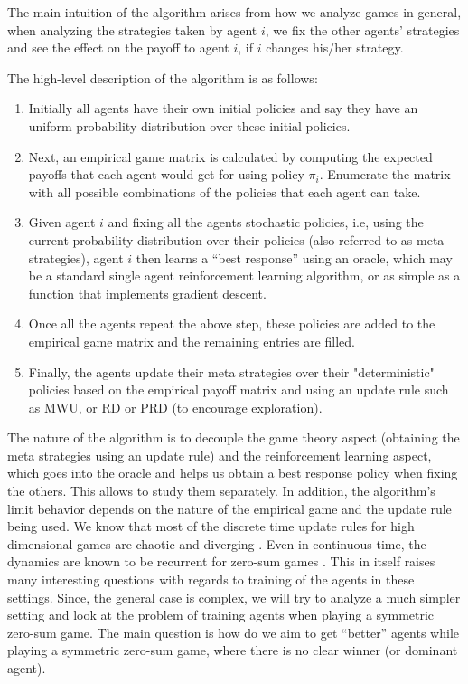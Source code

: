 \documentclass{article}
\begin{document}
The main intuition of the algorithm arises from how we analyze games in general, when analyzing the strategies taken by agent $i$, we fix the other agents' strategies and see the effect on the payoff to agent $i$, if $i$ changes his/her strategy. 

The high-level description of the algorithm is as follows:
\begin{enumerate}
	\item Initially all agents have their own initial policies and say they have an uniform probability distribution over these initial policies.
	\item Next, an empirical game matrix is calculated by computing the expected payoffs that each agent would get for using policy $\pi_i$. Enumerate the matrix with all possible combinations of the policies that each agent can take.
	\item Given agent $i$ and fixing all the agents stochastic policies, i.e, using the current probability distribution over their policies (also referred to as meta strategies), agent $i$ then learns a ``best response'' using an oracle, which may be a standard single agent reinforcement learning algorithm, or as simple as a function that implements gradient descent.
	\item Once all the agents repeat the above step, these policies are added to the empirical game matrix and the remaining entries are filled.
	\item Finally, the agents update their meta strategies over their "deterministic" policies based on the empirical payoff matrix and using an update rule such as MWU, or RD or PRD (to encourage exploration).
\end{enumerate}

The nature of the algorithm is to decouple the game theory aspect (obtaining the meta strategies using an update rule) and the reinforcement learning aspect, which goes into the oracle and helps us obtain a best response policy when fixing the others. This allows to study them separately. In addition, the algorithm's limit behavior depends on the nature of the empirical game and the update rule being used. We know that most of the discrete time update rules for high dimensional games are chaotic and diverging \cite{bailey2018multiplicative}. Even in continuous time, the dynamics are known to be recurrent for zero-sum games \cite{mertikopoulos2018cycles}. This in itself raises many interesting questions with regards to training of the agents in these settings.
Since, the general case is complex, we will try to analyze a much simpler setting and look at the problem of training agents when playing a symmetric zero-sum game. The main question is how do we aim to get ``better'' agents while playing a symmetric zero-sum game, where there is no clear winner (or dominant agent).
\end{document}
